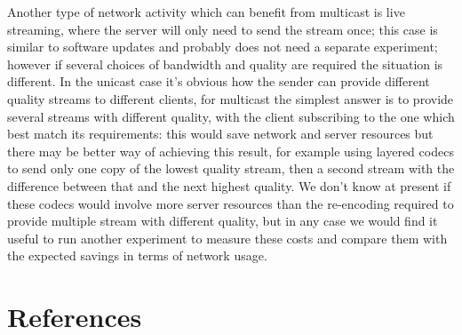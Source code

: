 \documentclass[a4paper,12pt]{article}
\newcommand{\TODO}[1]{\par\noindent%
\hspace*{\fill}%
\framebox{\parbox{0.9\linewidth}{{\bf TODO: }#1}}%
\hspace*{\fill}%
}
\begin{document}
Another type of network activity which can benefit from multicast is
live streaming, where the server will only need to send the stream once;
this case is similar to software updates and probably does not need a
separate experiment; however if several choices of bandwidth and quality
are required the situation is different.  In the unicast case it's obvious
how the sender can provide different quality streams to different clients,
for multicast the simplest answer is to provide several streams with
different quality, with the client subscribing to the one which best
match its requirements: this would save network and server resources
but there may be better way of achieving this result, for example using
layered codecs to send only one copy of the lowest quality stream, then
a second stream with the difference between that and the next highest
quality. We don't know at present if these codecs would involve more
server resources than the re-encoding required to provide multiple
stream with different quality, but in any case we would find it useful
to run another experiment to measure these costs and compare them with
the expected savings in terms of network usage.

\section*{References}
\TODO{No work is an island}
\end{document}
